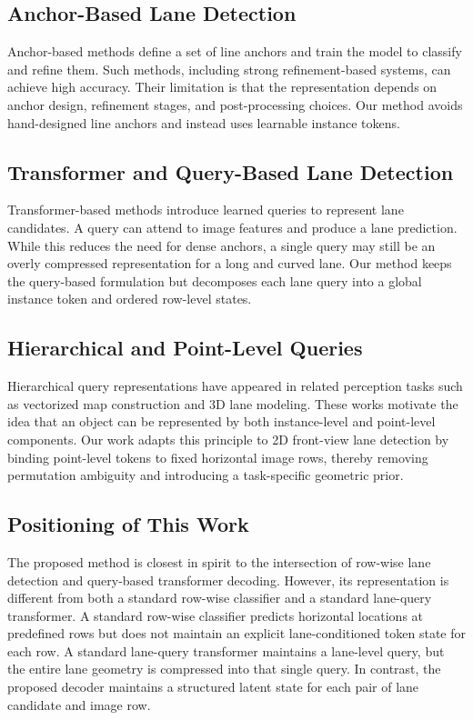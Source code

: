 \documentclass[conference]{IEEEtran}
\begin{document}
\subsection{Anchor-Based Lane Detection}

Anchor-based methods define a set of line anchors and train the model to classify and refine them. Such methods, including strong refinement-based systems, can achieve high accuracy. Their limitation is that the representation depends on anchor design, refinement stages, and post-processing choices. Our method avoids hand-designed line anchors and instead uses learnable instance tokens.

\subsection{Transformer and Query-Based Lane Detection}

Transformer-based methods introduce learned queries to represent lane candidates. A query can attend to image features and produce a lane prediction. While this reduces the need for dense anchors, a single query may still be an overly compressed representation for a long and curved lane. Our method keeps the query-based formulation but decomposes each lane query into a global instance token and ordered row-level states.

\subsection{Hierarchical and Point-Level Queries}

Hierarchical query representations have appeared in related perception tasks such as vectorized map construction and 3D lane modeling. These works motivate the idea that an object can be represented by both instance-level and point-level components. Our work adapts this principle to 2D front-view lane detection by binding point-level tokens to fixed horizontal image rows, thereby removing permutation ambiguity and introducing a task-specific geometric prior.

\subsection{Positioning of This Work}

The proposed method is closest in spirit to the intersection of row-wise lane detection and query-based transformer decoding. However, its representation is different from both a standard row-wise classifier and a standard lane-query transformer. A standard row-wise classifier predicts horizontal locations at predefined rows but does not maintain an explicit lane-conditioned token state for each row. A standard lane-query transformer maintains a lane-level query, but the entire lane geometry is compressed into that single query. In contrast, the proposed decoder maintains a structured latent state for each pair of lane candidate and image row.
\end{document}
